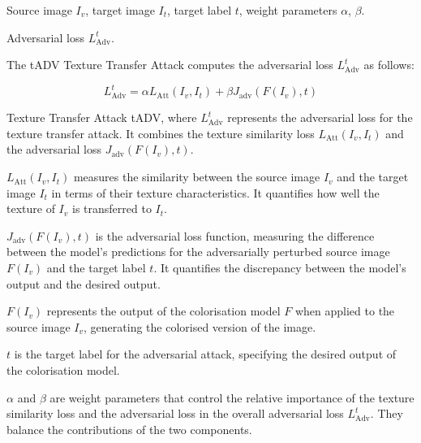 Source image $I_v$, target image $I_t$, target label $t$, weight parameters $\alpha$, $\beta$.

Adversarial loss $L_{\text{Adv}}^t$.

The tADV Texture Transfer Attack computes the adversarial loss $L_{\text{Adv}}^t$ as follows:

\[
L_{\text{Adv}}^t = \alpha L_{\text{Att}}(I_v, I_t) + \beta J_{\text{adv}} \left(F(I_v), t \right)
\]

 Texture Transfer Attack tADV, where
$L_{\text{Adv}}^t$ represents the adversarial loss for the texture transfer attack. It combines the texture similarity loss $L_{\text{Att}}(I_v, I_t)$ and the adversarial loss $J_{\text{adv}} \left(F(I_v), t \right)$.

$L_{\text{Att}}(I_v, I_t)$ measures the similarity between the source image $I_v$ and the target image $I_t$ in terms of their texture characteristics. It quantifies how well the texture of $I_v$ is transferred to $I_t$.

$J_{\text{adv}} \left(F(I_v), t \right)$ is the adversarial loss function, measuring the difference between the model's predictions for the adversarially perturbed source image $F(I_v)$ and the target label $t$. It quantifies the discrepancy between the model's output and the desired output.

$F(I_v)$ represents the output of the colorisation model $F$ when applied to the source image $I_v$, generating the colorised version of the image.

$t$ is the target label for the adversarial attack, specifying the desired output of the colorisation model.

$\alpha$ and $\beta$ are weight parameters that control the relative importance of the texture similarity loss and the adversarial loss in the overall adversarial loss $L_{\text{Adv}}^t$. They balance the contributions of the two components.
